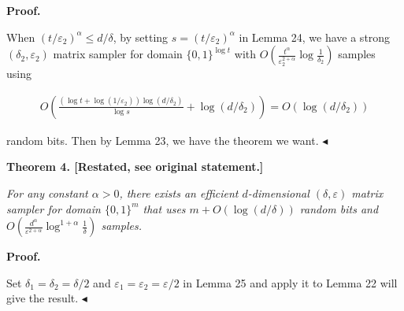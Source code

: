 


\par\medskip\noindent\textbf{Proof.}\par




When $(t/\varepsilon_{2})^{\alpha}\leq d/\delta$, by setting $s=(t/\varepsilon_{2})^{\alpha}$ in Lemma 24, we have a strong $(\delta_{2},\varepsilon_{2})$ matrix sampler for domain $\{0,1\}^{\log t}$ with $O(\frac{{t}^{\alpha}}{\varepsilon_{2}^{2+\alpha}}\log\frac{1}{\delta_{2}})$ samples using\par


\[\begin{gathered}
O\left(\frac{(\log t+\log(1/\varepsilon_{2}))\log(d/\delta_{2})}{\log s}+\log(d/\delta_{2})\right)=O(\log(d/\delta_{2}))
\end{gathered}\]


random bits. Then by Lemma 23, we have the theorem we want.
$\blacktriangleleft$\par






\par\medskip\noindent\textbf{
\textbf{Theorem 4}\textbf{.}
[Restated, see original statement.]}\par



\emph{For any constant $\alpha>0$, there exists an efficient $d$-dimensional $(\delta,\varepsilon)$ matrix sampler for domain $\{0,1\}^{m}$ that uses $m+O(\log(d/\delta))$ random bits and $O(\frac{d^{\alpha}}{\varepsilon^{2+\alpha}}\log^{1+\alpha}\frac{1}{\delta})$ samples.}\par








\par\medskip\noindent\textbf{Proof.}\par




Set $\delta_{1}=\delta_{2}=\delta/2$ and $\varepsilon_{1}=\varepsilon_{2}=\varepsilon/2$ in Lemma 25 and apply it to Lemma 22 will give the result.
$\blacktriangleleft$\par







